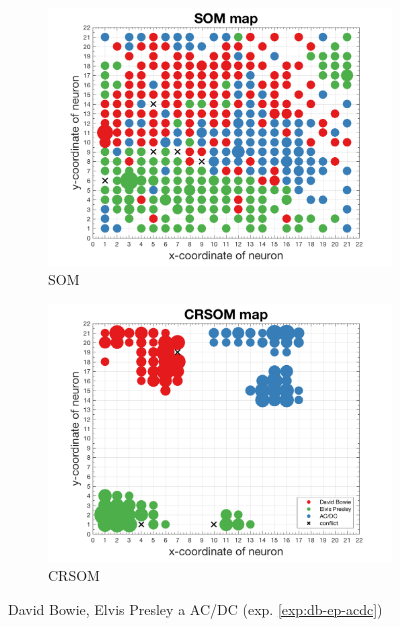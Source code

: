 \documentclass[thesis=M,czech]{FITthesis}[2012/06/26]
\begin{document}
\begin{figure}
\centering
\begin{subfigure}{.5\textwidth}
  \centering
  \includegraphics[width=.99\linewidth]{exp_db_ep_acdc_som.png}
  \caption{SOM}
  \label{fig:sub1}
\end{subfigure}%
\begin{subfigure}{.5\textwidth}
  \centering
  \includegraphics[width=.99\linewidth]{exp_db_ep_acdc_crsom.png}
  \caption{CRSOM}
  \label{fig:sub2}
\end{subfigure}
\caption{David Bowie, Elvis Presley a AC/DC (exp. \ref{exp:db-ep-acdc})}
\label{fig:db_ep_acdc}
\end{figure}
\end{document}
